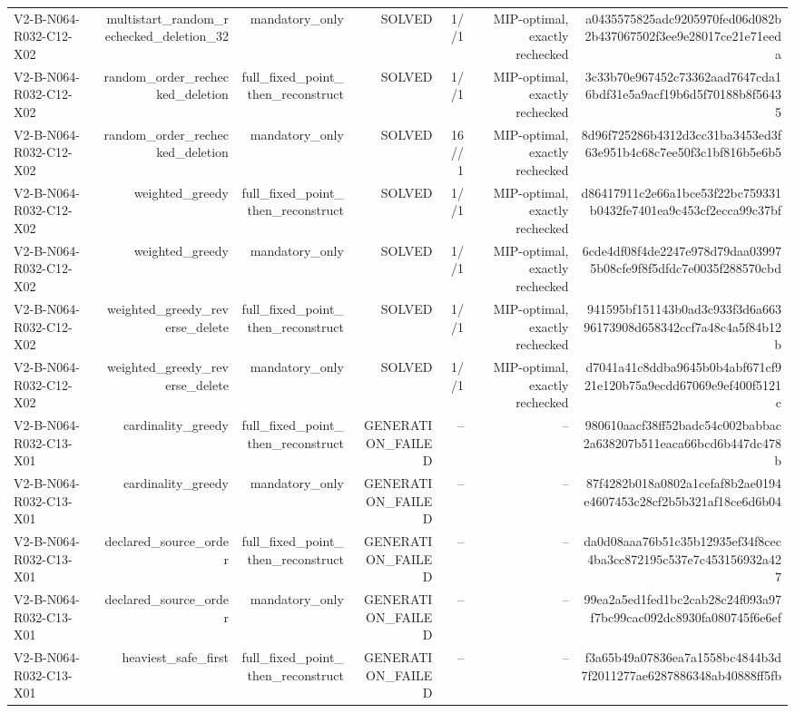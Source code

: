 {\begin{longtable}{lrrrrrr}
V2-B-N064-R032-C12-X02 & multistart\_random\_rechecked\_deletion\_32 & mandatory\_only & SOLVED & 1//1 & MIP-optimal, exactly rechecked & a0435575825adc9205970fed06d082b2b437067502f3ee9e28017ce21e71eeda \\
V2-B-N064-R032-C12-X02 & random\_order\_rechecked\_deletion & full\_fixed\_point\_then\_reconstruct & SOLVED & 1//1 & MIP-optimal, exactly rechecked & 3c33b70e967452c73362aad7647cda16bdf31e5a9acf19b6d5f70188b8f56435 \\
V2-B-N064-R032-C12-X02 & random\_order\_rechecked\_deletion & mandatory\_only & SOLVED & 16//1 & MIP-optimal, exactly rechecked & 8d96f725286b4312d3cc31ba3453ed3f63e951b4c68c7ee50f3c1bf816b5e6b5 \\
V2-B-N064-R032-C12-X02 & weighted\_greedy & full\_fixed\_point\_then\_reconstruct & SOLVED & 1//1 & MIP-optimal, exactly rechecked & d86417911c2e66a1bce53f22bc759331b0432fe7401ea9c453cf2ecca99c37bf \\
V2-B-N064-R032-C12-X02 & weighted\_greedy & mandatory\_only & SOLVED & 1//1 & MIP-optimal, exactly rechecked & 6cde4df08f4de2247e978d79daa039975b08cfe9f8f5dfdc7e0035f288570cbd \\
V2-B-N064-R032-C12-X02 & weighted\_greedy\_reverse\_delete & full\_fixed\_point\_then\_reconstruct & SOLVED & 1//1 & MIP-optimal, exactly rechecked & 941595bf151143b0ad3c933f3d6a66396173908d658342ccf7a48c4a5f84b12b \\
V2-B-N064-R032-C12-X02 & weighted\_greedy\_reverse\_delete & mandatory\_only & SOLVED & 1//1 & MIP-optimal, exactly rechecked & d7041a41c8ddba9645b0b4abf671cf921e120b75a9ecdd67069e9ef400f5121c \\
V2-B-N064-R032-C13-X01 & cardinality\_greedy & full\_fixed\_point\_then\_reconstruct & GENERATION\_FAILED & -- & -- & 980610aacf38ff52badc54c002babbac2a638207b511eaca66bcd6b447dc478b \\
V2-B-N064-R032-C13-X01 & cardinality\_greedy & mandatory\_only & GENERATION\_FAILED & -- & -- & 87f4282b018a0802a1cefaf8b2ae0194e4607453c28cf2b5b321af18ce6d6b04 \\
V2-B-N064-R032-C13-X01 & declared\_source\_order & full\_fixed\_point\_then\_reconstruct & GENERATION\_FAILED & -- & -- & da0d08aaa76b51c35b12935ef34f8cec4ba3cc872195c537e7c453156932a427 \\
V2-B-N064-R032-C13-X01 & declared\_source\_order & mandatory\_only & GENERATION\_FAILED & -- & -- & 99ea2a5ed1fed1bc2cab28c24f093a97f7bc99cac092dc8930fa080745f6e6ef \\
V2-B-N064-R032-C13-X01 & heaviest\_safe\_first & full\_fixed\_point\_then\_reconstruct & GENERATION\_FAILED & -- & -- & f3a65b49a07836ea7a1558bc4844b3d7f2011277ae6287886348ab40888ff5fb \\

\end{longtable}}
